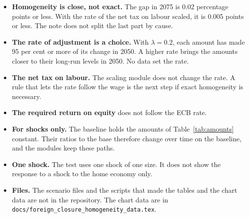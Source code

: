 \documentclass[11pt,a4paper]{article}
\newcommand{\code}[1]{\texttt{#1}}
\begin{document}
\begin{itemize}
\item \textbf{Homogeneity is close, not exact.} The gap in 2075 is 0.02 percentage points or less. With the rate of the net tax on labour scaled, it is 0.005 points or less. The note does not split the last part by cause.
\item \textbf{The rate of adjustment is a choice.} With $\lambda = 0.2$, each amount has made 95 per cent or more of its change in 2050. A higher rate brings the amounts closer to their long-run levels in 2050. No data set the rate.
\item \textbf{The net tax on labour.} The scaling module does not change the rate. A rule that lets the rate follow the wage is the next step if exact homogeneity is necessary.
\item \textbf{The required return on equity} does not follow the ECB rate.
\item \textbf{For shocks only.} The baseline holds the amounts of Table~\ref{tab:amounts} constant. Their ratios to the base therefore change over time on the baseline, and the modules keep these paths.
\item \textbf{One shock.} The test uses one shock of one size. It does not show the response to a shock to the home economy only.
\item \textbf{Files.} The scenario files and the scripts that made the tables and the chart data are not in the repository. The chart data are in \code{docs/foreign\_closure\_homogeneity\_data.tex}.
\end{itemize}
\end{document}
